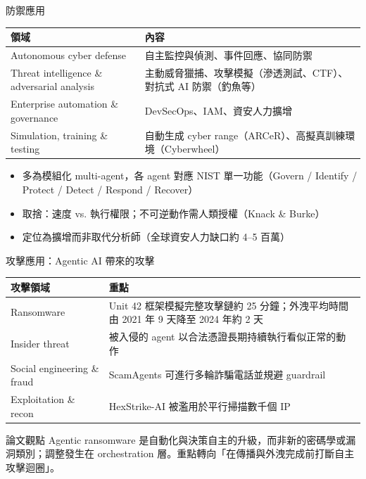 \documentclass[aspectratio=169]{beamer}
\newcommand{\tabsetup}{\renewcommand{\arraystretch}{1.18}}
\begin{document}
\begin{frame}{防禦應用}
    \tabsetup
    \footnotesize
    \begin{table}
        \centering
        \begin{tabular}{@{}l p{7.3cm}@{}}
            \toprule
            領域 & 內容 \\
            \midrule
            Autonomous cyber defense & 自主監控與偵測、事件回應、協同防禦 \\
            Threat intelligence \& adversarial analysis & 主動威脅獵捕、攻擊模擬（滲透測試、CTF）、對抗式 AI 防禦（釣魚等） \\
            Enterprise automation \& governance & DevSecOps、IAM、資安人力擴增 \\
            Simulation, training \& testing & 自動生成 cyber range（ARCeR）、高擬真訓練環境（Cyberwheel） \\
            \bottomrule
        \end{tabular}
    \end{table}

    \small
    \begin{itemize}
        \item 多為\alert{模組化 multi-agent}，各 agent 對應 NIST 單一功能（Govern / Identify / Protect / Detect / Respond / Recover）
        \item 取捨：速度 vs. 執行權限；不可逆動作需人類授權（Knack \& Burke）
        \item 定位為\alert{擴增而非取代}分析師（全球資安人力缺口約 4--5 百萬）
    \end{itemize}
\end{frame}


\begin{frame}{攻擊應用：Agentic AI 帶來的攻擊}
    \tabsetup
    \footnotesize
    \begin{table}
        \centering
        \begin{tabular}{@{}l p{8.3cm}@{}}
            \toprule
            攻擊領域 & 重點 \\
            \midrule
            Ransomware & Unit 42 框架模擬完整攻擊鏈約 25 分鐘；外洩平均時間由 2021 年 9 天降至 2024 年約 2 天 \\
            Insider threat & 被入侵的 agent 以合法憑證長期持續執行看似正常的動作 \\
            Social engineering \& fraud & ScamAgents 可進行多輪詐騙電話並規避 guardrail \\
            Exploitation \& recon & HexStrike-AI 被濫用於平行掃描數千個 IP \\
            \bottomrule
        \end{tabular}
    \end{table}

    \begin{block}{論文觀點}
        Agentic ransomware 是\alert{自動化與決策自主的升級}，而非新的密碼學或漏洞類別；調整發生在 orchestration 層。重點轉向「在傳播與外洩完成前打斷自主攻擊迴圈」。
    \end{block}
\end{frame}
\end{document}
